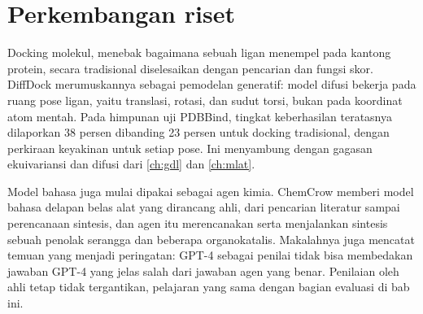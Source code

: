 \section{Perkembangan riset}

Docking molekul, menebak bagaimana sebuah ligan menempel pada kantong protein, secara tradisional diselesaikan dengan
pencarian dan fungsi skor. DiffDock \citep{corso2023} merumuskannya sebagai pemodelan generatif: model difusi bekerja pada
ruang pose ligan, yaitu translasi, rotasi, dan sudut torsi, bukan pada koordinat atom mentah. Pada himpunan uji PDBBind,
tingkat keberhasilan teratasnya dilaporkan 38 persen dibanding 23 persen untuk docking tradisional, dengan perkiraan
keyakinan untuk setiap pose. Ini menyambung dengan gagasan ekuivariansi dan difusi dari \cref{ch:gdl} dan \cref{ch:mlat}.

Model bahasa juga mulai dipakai sebagai agen kimia. ChemCrow \citep{bran2024} memberi model bahasa delapan belas alat
yang dirancang ahli, dari pencarian literatur sampai perencanaan sintesis, dan agen itu merencanakan serta menjalankan
sintesis sebuah penolak serangga dan beberapa organokatalis. Makalahnya juga mencatat temuan yang menjadi peringatan:
GPT-4 sebagai penilai tidak bisa membedakan jawaban GPT-4 yang jelas salah dari jawaban agen yang benar. Penilaian oleh
ahli tetap tidak tergantikan, pelajaran yang sama dengan bagian evaluasi di bab ini.

